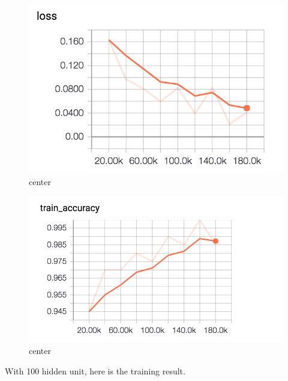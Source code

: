 \documentclass[12pt]{article}
\begin{document}
\begin{figure}[H]
  \caption{center}
  \centering
    \includegraphics[scale=1]{3test.png}
\end{figure}

\begin{figure}[H]
  \caption{center}
  \centering
    \includegraphics[scale=1]{3train.png}
\end{figure}









With 100 hidden unit, here is the training result.
\end{document}
